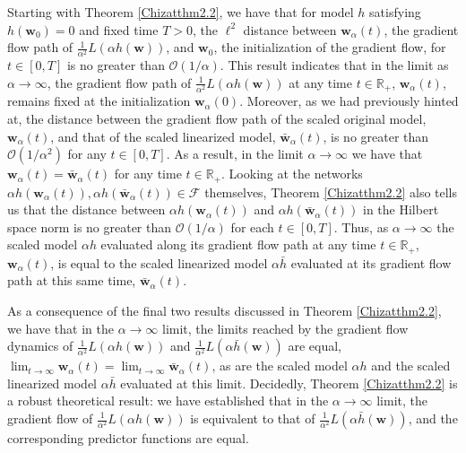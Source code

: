 \documentclass{article}
\begin{document}
Starting with Theorem \ref{Chizatthm2.2}, we have that for model $h$ satisfying $h(\boldsymbol{w}_0) = 0$ and fixed time $T > 0$, the $\ell^2$ distance between $\boldsymbol{w}_{\alpha}(t)$, the gradient flow path of $\frac{1}{\alpha^2} L(\alpha h(\boldsymbol{w}))$, and $\boldsymbol{w}_0$, the initialization of the gradient flow, for $t \in [0, T]$ is no greater than $\mathcal{O}(1/\alpha)$. This result indicates that in the limit as $\alpha \rightarrow \infty$, the gradient flow path of $\frac{1}{\alpha^2}L(\alpha h(\boldsymbol{w}))$ at any time $t \in \mathbb{R}_+$, $\boldsymbol{w}_{\alpha}(t)$, remains fixed at the initialization $\boldsymbol{w}_{\alpha}(0)$. Moreover, as we had previously hinted at, the distance between the gradient flow path of the scaled original model, $\boldsymbol{w}_{\alpha}(t)$, and that of the scaled linearized model, $\boldsymbol{\bar{w}}_{\alpha}(t)$, is no greater than $\mathcal{O}(1/\alpha^2)$ for any $t \in [0, T]$. As a result, in the limit $\alpha \rightarrow \infty$ we have that $\boldsymbol{w}_{\alpha}(t) = \boldsymbol{\bar{w}}_{\alpha}(t)$ for any time $t\in \mathbb{R}_+$. Looking at the networks $\alpha h(\boldsymbol{w}_{\alpha}(t)), \alpha h(\boldsymbol{\bar{w}}_{\alpha}(t)) \in \mathcal{F}$ themselves, Theorem \ref{Chizatthm2.2} also tells us that the distance between $\alpha h(\boldsymbol{w}_{\alpha}(t))$ and $\alpha h(\boldsymbol{\bar{w}}_{\alpha}(t))$ in the Hilbert space norm is no greater than $\mathcal{O}(1/\alpha)$ for each $t \in [0, T]$. Thus, as $\alpha \rightarrow \infty$ the scaled model $\alpha h$ evaluated along its gradient flow path at any time $t \in \mathbb{R}_+$, $\boldsymbol{w}_{\alpha}(t)$, is equal to the scaled linearized model $\alpha \bar{h}$ evaluated at its gradient flow path at this same time, $\boldsymbol{\bar{w}}_{\alpha}(t)$. 

As a consequence of the final two results discussed in Theorem \ref{Chizatthm2.2}, we have that in the $\alpha \rightarrow \infty$ limit, the limits reached by the gradient flow dynamics of  $\frac{1}{\alpha^2} L(\alpha h(\boldsymbol{w}))$ and $\frac{1}{\alpha^2} L(\alpha \bar{h}(\boldsymbol{w}))$ are equal, $\lim_{t \to \infty} \boldsymbol{w}_{\alpha}(t) = \lim_{t \to \infty} \boldsymbol{\bar{w}}_{\alpha}(t)$, as are the scaled model $\alpha h$ and the scaled linearized model $\alpha \bar{h}$ evaluated at this limit. Decidedly, Theorem \ref{Chizatthm2.2} is a robust theoretical result: we have established that in the $\alpha \rightarrow \infty$ limit, the gradient flow of $\frac{1}{\alpha^2}L(\alpha h(\boldsymbol{w}))$ is equivalent to that of $\frac{1}{\alpha^2}L(\alpha \bar{h}(\boldsymbol{w}))$, and the corresponding predictor functions are equal. 
\end{document}
